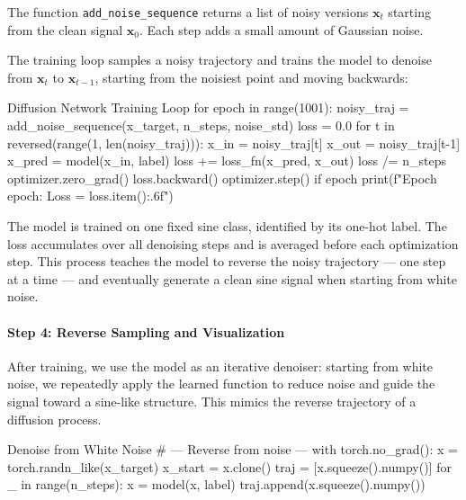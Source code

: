 The function \texttt{add\_noise\_sequence} returns a list of noisy versions \( \mathbf{x}_t \) starting from the clean signal \( \mathbf{x}_0 \). Each step adds a small amount of Gaussian noise.

The training loop samples a noisy trajectory and trains the model to denoise from \( \mathbf{x}_t \) to \( \mathbf{x}_{t-1} \), starting from the noisiest point and moving backwards:

\begin{codeonly}{Diffusion Network Training Loop}
for epoch in range(1001):
    noisy_traj = add_noise_sequence(x_target, n_steps, noise_std)
    loss = 0.0
    for t in reversed(range(1, len(noisy_traj))):
        x_in = noisy_traj[t]
        x_out = noisy_traj[t-1]
        x_pred = model(x_in, label)
        loss += loss_fn(x_pred, x_out)
    loss /= n_steps
    optimizer.zero_grad()
    loss.backward()
    optimizer.step()
    if epoch %
        print(f"Epoch {epoch}: Loss = {loss.item():.6f}")
\end{codeonly}

The model is trained on one fixed sine class, identified by its one-hot label. The loss accumulates over all denoising steps and is averaged before each optimization step. This process teaches the model to reverse the noisy trajectory — one step at a time — and eventually generate a clean sine signal when starting from white noise.

%
\paragraph{Step 4: Reverse Sampling and Visualization}

After training, we use the model as an iterative denoiser: starting from white noise, we repeatedly apply the learned function to reduce noise and guide the signal toward a sine-like structure. This mimics the reverse trajectory of a diffusion process.

\begin{codeonly}{Denoise from White Noise}
# --- Reverse from noise ---
with torch.no_grad():
    x = torch.randn_like(x_target)
    x_start = x.clone()
    traj = [x.squeeze().numpy()]
    for _ in range(n_steps):
        x = model(x, label)
        traj.append(x.squeeze().numpy())
\end{codeonly}

